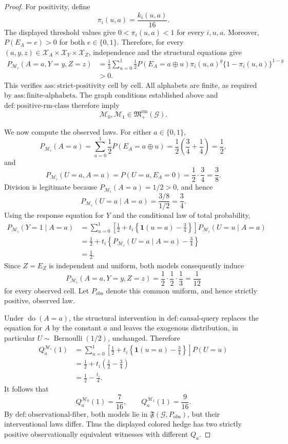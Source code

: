 \documentclass{article}
\begin{document}
\begin{proof}
For positivity, define
\[
 \pi_i(u,a)=\frac{k_i(u,a)}{16}.
\]
The displayed threshold values give \(0<\pi_i(u,a)<1\) for every \(i,u,a\). Moreover, \(P(E_A=e)>0\) for both \(e\in\{0,1\}\). Therefore, for every \((a,y,z)\in\mathcal X_A\times\mathcal X_Y\times\mathcal X_Z\), independence and the structural equations give
\[
 \begin{aligned}
 P_{\mathcal M_i}(A=a,Y=y,Z=z)
 &=\frac13\sum_{u=0}^1
 \frac12 P(E_A=a\mathbin{\oplus}u)
 \pi_i(u,a)^y\{1-\pi_i(u,a)\}^{1-y}\\
 &>0.
 \end{aligned}
\]
This verifies \(\mathrm{ass{:}strict\text{-}positivity}\) cell by cell. All alphabets are finite, as required by \(\mathrm{ass{:}finite\text{-}alphabets}\). The graph conditions established above and \(\mathrm{def{:}positive\text{-}rm\text{-}class}\) therefore imply
\[
 \mathcal M_0,\mathcal M_1
 \in\mathfrak M_{+}^{\mathrm{rm}}(\mathcal G).
\]

We now compute the observed laws. For either \(a\in\{0,1\}\),
\[
 P_{\mathcal M_i}(A=a)
 =\sum_{u=0}^1\frac12P(E_A=a\mathbin{\oplus}u)
 =\frac12\left(\frac34+\frac14\right)
 =\frac12,
\]
and
\[
 P_{\mathcal M_i}(U=a,A=a)
 =P(U=a,E_A=0)
 =\frac12\cdot\frac34
 =\frac38.
\]
Division is legitimate because \(P_{\mathcal M_i}(A=a)=1/2>0\), and hence
\[
 P_{\mathcal M_i}(U=a\mid A=a)
 =\frac{3/8}{1/2}
 =\frac34.
\]
Using the response equation for \(Y\) and the conditional law of total probability,
\[
 \begin{aligned}
 P_{\mathcal M_i}(Y=1\mid A=a)
 &=\sum_{u=0}^1
 \left[\frac12+t_i\left\{\mathbf 1(u=a)-\frac34\right\}\right]
 P_{\mathcal M_i}(U=u\mid A=a)\\
 &=\frac12+t_i\left\{P_{\mathcal M_i}(U=a\mid A=a)-\frac34\right\}\\
 &=\frac12.
 \end{aligned}
\]
Since \(Z=E_Z\) is independent and uniform, both models consequently induce
\[
 P_{\mathcal M_i}(A=a,Y=y,Z=z)
 =\frac12\cdot\frac12\cdot\frac13
 =\frac1{12}
\]
for every observed cell. Let \(P_{\mathrm{obs}}\) denote this common uniform, and hence strictly positive, observed law.

Under \(\operatorname{do}(A=a)\), the structural intervention in \(\mathrm{def{:}causal\text{-}query}\) replaces the equation for \(A\) by the constant \(a\) and leaves the exogenous distribution, in particular \(U\sim\operatorname{Bernoulli}(1/2)\), unchanged. Therefore
\[
 \begin{aligned}
 Q_a^{\mathcal M_i}(1)
 &=\sum_{u=0}^1
 \left[\frac12+t_i\left\{\mathbf 1(u=a)-\frac34\right\}\right]P(U=u)\\
 &=\frac12+t_i\left(\frac12-\frac34\right)\\
 &=\frac12-\frac{t_i}{4}.
 \end{aligned}
\]
It follows that
\[
 Q_a^{\mathcal M_0}(1)=\frac7{16},
 \qquad
 Q_a^{\mathcal M_1}(1)=\frac9{16}.
\]
By \(\mathrm{def{:}observational\text{-}fiber}\), both models lie in \(\mathfrak F(\mathcal G,P_{\mathrm{obs}})\), but their interventional laws differ. Thus the displayed colored hedge has two strictly positive observationally equivalent witnesses with different \(Q_a\).


\end{proof}
\end{document}
